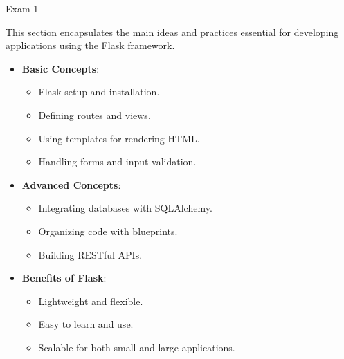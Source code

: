 \begin{examnotes}{Exam 1}
    \begin{highlight}
        This section encapsulates the main ideas and practices essential for developing applications using the Flask framework.
        
        \begin{itemize}
            \item \textbf{Basic Concepts}:
                \begin{itemize}
                    \item Flask setup and installation.
                    \item Defining routes and views.
                    \item Using templates for rendering HTML.
                    \item Handling forms and input validation.
                \end{itemize}
            \item \textbf{Advanced Concepts}:
                \begin{itemize}
                    \item Integrating databases with SQLAlchemy.
                    \item Organizing code with blueprints.
                    \item Building RESTful APIs.
                \end{itemize}
            \item \textbf{Benefits of Flask}:
                \begin{itemize}
                    \item Lightweight and flexible.
                    \item Easy to learn and use.
                    \item Scalable for both small and large applications.
                \end{itemize}
        \end{itemize}
    \end{highlight}
\end{examnotes}

